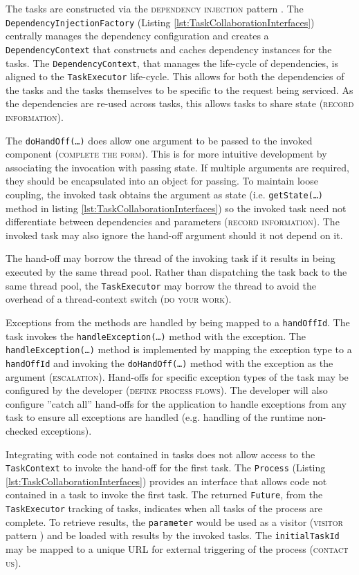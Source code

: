 \documentclass[prodmode]{style/acmlarge}
\begin{document}
The tasks are constructed via the \textsc{dependency injection} pattern
\cite{ioc}.  The \texttt{Dependency\-InjectionFactory} (Listing
\ref{lst:TaskCollaborationInterfaces}) centrally manages the dependency
configuration and creates a \texttt{Depend\-ency\-Context} that constructs and
caches dependency instances for the tasks.  The \texttt{Dependency\-Context},
that manages the life-cycle of dependencies, is aligned to the
\texttt{TaskExecutor} life-cycle.  This allows for both the dependencies of the
tasks and the tasks themselves to be specific to the request being serviced.
As the dependencies are re-used across tasks, this allows tasks to share state
(\textsc{record information}).

The \texttt{doHandOff(\ldots)} does allow one argument to be passed to the
invoked component (\textsc{complete the form}).  This is for more intuitive
development by associating the invocation with passing state.  If multiple
arguments are required, they should be encapsulated into an object for passing.
To maintain loose coupling, the invoked task obtains the argument as state (i.e.
\texttt{getState(\ldots)} method in listing
\ref{lst:TaskCollaborationInterfaces}) so the invoked task need not
differentiate between dependencies and parameters (\textsc{record information}).
The invoked task may also ignore the hand-off argument should it not depend on
it.

The hand-off may borrow the thread of the invoking task if it results in being
executed by the same thread pool.  Rather than dispatching the task back to the
same thread pool, the \texttt{TaskExecutor} may borrow the thread to avoid the
overhead of a thread-context switch (\textsc{do your work}).

Exceptions from the methods are handled by being mapped to a \texttt{handOffId}.
 The task invokes the \texttt{handle\-Excep\-tion(\ldots)} method with the
exception.  The \texttt{handleException(\ldots)} method is implemented by
mapping the exception type to a \texttt{handOffId} and invoking the
\texttt{doHandOff(\ldots)} method with the exception as the argument
(\textsc{escalation}).  Hand-offs for specific exception types of the task may
be configured by the developer (\textsc{define process flows}).  The developer
will also configure ''catch all'' hand-offs for the application to handle
exceptions from any task to ensure all exceptions are handled (e.g. handling of
the runtime non-checked exceptions).

Integrating with code not contained in tasks does not allow access to the
\texttt{TaskContext} to invoke the hand-off for the first task.  The
\texttt{Process} (Listing \ref{lst:TaskCollaborationInterfaces}) provides an
interface that allows code not contained in a task to invoke the first task.
The returned \texttt{Future}, from the \texttt{TaskExecutor} tracking of tasks,
indicates when all tasks of the process are complete.  To retrieve results, the
\texttt{parameter} would be used as a visitor (\textsc{visitor} pattern
\cite{gof}) and be loaded with results by the invoked tasks.  The
\texttt{initialTaskId} may be mapped to a unique URL for external triggering of
the process (\textsc{contact us}).
\end{document}
